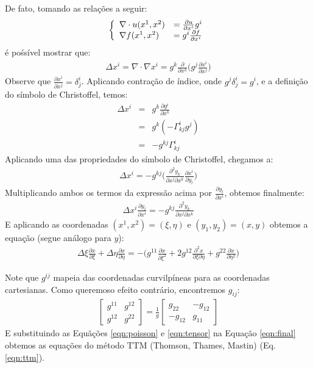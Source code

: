\documentclass{article}
\newcommand{\diff}[2]{
	\frac{\partial #1}{\partial #2}
}
\newcommand{\diffxixi}[1]{
	\diff{#1}{\xi^2}
}
\newcommand{\diffetaeta}[1]{
	\diff{#1}{\eta^2}
}
\newcommand{\diffxieta}[1]{
	\diff{^2#1}{\xi\partial\eta}
}
\newcommand{\diffxi}[1]{
	\diff{#1}{\xi}
}
\newcommand{\diffeta}[1]{
	\diff{#1}{\eta}
}
\begin{document}
			De fato, tomando as relações a seguir:
			\begin{eqnarray*}
				\left\{
				\begin{array}{l l}
					\nabla\cdot u(x^1, x^2) &= \diff{u}{x^i}g^i\\
					\nabla f(x^1, x^2) &= g^i\diff{f}{x^i}
				\end{array} \right.
			\end{eqnarray*}
			é pośsível mostrar que:
			\begin{eqnarray*}
				\Delta x^i = \nabla\cdot\nabla x^i = g^k \frac{\partial}{\partial x^k}\Big( g^j \diff{x^i}{x^j} \Big) \nonumber
			\end{eqnarray*}
			Observe que $\diff{x^i}{x^j} = \delta^i_j$. Aplicando contração de índice, onde $g^j\delta^i_j = g^i$, e a definição do símbolo de Christoffel, temos:
			\begin{eqnarray*}
				\Delta x^i &=& g^k \diff{g^i}{x^k} \\ \nonumber
				 &=& g^k (-\Gamma^i_{kj} g^j)\\ \nonumber 
				 &=& -g^{kj}\Gamma^i_{kj} \nonumber
 			\end{eqnarray*}
 			Aplicando uma das propriedades do símbolo de Christoffel, chegamos a:
 			\begin{eqnarray}
 				\Delta x^i = -g^{kj}\Big( \diff{^2y_k}{x^j\partial x^k} \diff{x^i}{ y_l} \Big)
 			\end{eqnarray}
 			Multiplicando ambos os termos da expressão acima por $\diff{y_ l}{x^i}$, obtemos finalmente:
 			\begin{eqnarray}
 				\Delta x^i \diff{y_ l}{x^i} = -g^{kj}  \diff{^2y_k}{x^j\partial x^k }
 			\end{eqnarray}
 			E aplicando as coordenadas $(x^1, x^2) = (\xi, \eta)$ e $(y_1,y_2) = (x,y)$ obtemos a equação (segue análogo para $y$):
 			\begin{eqnarray}
 				\Delta\xi \diffxi{x} + \Delta\eta\diffeta{x} = - \Big(g^{11}\diffxixi{x} + 2g^{12}\diffxieta{x} + g^{22}\diffetaeta{x}\Big)\label{eqn:final}
 			\end{eqnarray}

 			Note que $g^{ij}$ mapeia das coordenadas curvilpíneas para as coordenadas cartesianas. Como queremoso efeito contrário, encontremos $g_{ij}$:
 			\begin{eqnarray}\label{eqn:tensor}
	 			\begin{bmatrix}
	 				g^{11} & g^{12}\\
	 				g^{12} & g^{22}	
	 			\end{bmatrix}
	 			=
	 			\frac{1}{g}
	 			\begin{bmatrix}
	 				g_{22} & -g_{12}\\
	 				-g_{12} & g_{11}
	 			\end{bmatrix}
 			\end{eqnarray}
 			E substituindo as Equãções \ref{eqn:poisson} e \ref{eqn:tensor} na Equação \ref{eqn:final} obtemos as equações do método TTM (Thomson, Thames, Mastin) (Eq. \ref{eqn:ttm}).
\end{document}
